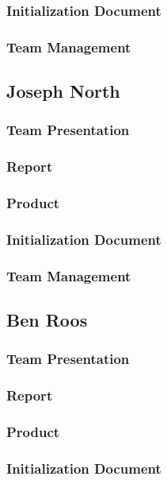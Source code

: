 \documentclass[12pt]{article}
\begin{document}
\begin{spacing}{1.5}
\subsubsection{Initialization Document}
\subsubsection{Team Management}

\clearpage

\subsection{Joseph North}
\subsubsection{Team Presentation}
\subsubsection{Report}
\subsubsection{Product}
\subsubsection{Initialization Document}
\subsubsection{Team Management}

\clearpage

\subsection{Ben Roos}
\subsubsection{Team Presentation}
\subsubsection{Report}
\subsubsection{Product}
\subsubsection{Initialization Document}

\end{spacing}
\end{document}
